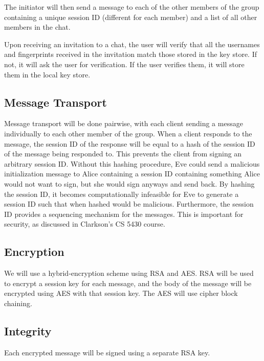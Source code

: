 \documentclass[a4paper]{article}
\begin{document}
The initiator will then send a message to each of the other members of the group containing a unique session ID (different for each member) and a list of all other members in the chat.

Upon receiving an invitation to a chat, the user will verify that all the usernames and fingerprints received in the invitation match those stored in the key store. If not, it will ask the user for verification. If the user verifies them, it will store them in the local key store.

\subsection{Message Transport}
Message transport will be done pairwise, with each client sending a message individually to each other member of the group. When a client responds to the message, the session ID of the response will be equal to a hash of the session ID of the message being responded to. This prevents the client from signing an arbitrary session ID. Without this hashing procedure, Eve could send a malicious initialization message to Alice containing a session ID containing something Alice would not want to sign, but she would sign anyways and send back. By hashing the session ID, it becomes computationally infeasible for Eve to generate a session ID such that when hashed would be malicious. Furthermore, the session ID provides a sequencing mechanism for the messages. This is important for security, as discussed in Clarkson's CS 5430 course. 

\subsection{Encryption} 
We will use a hybrid-encryption scheme using RSA and AES. RSA will be used to encrypt a session key for each message, and the body of the message will be encrypted using AES with that session key. The AES will use cipher block chaining.

\subsection{Integrity}
Each encrypted message will be signed using a separate RSA key.
\end{document}
